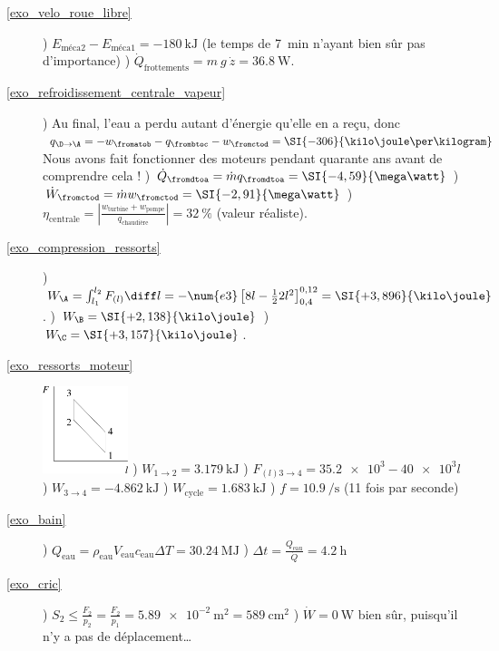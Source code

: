 	\begin{description}
		\item[\ref{exo_velo_roue_libre}] 
					) $E_{\text{méca}2} - E_{\text{méca}1} = \SI{-180}{\kilo\joule}$ (le temps de \SI{7}{\minute} n’ayant bien sûr pas d’importance) 
					) $\dot Q_{\text{frottements}} = m \ g \ \dot z = \SI{36,8}{\watt}$.
		\item[\ref{exo_refroidissement_centrale_vapeur}] 	
					) Au final, l’eau a perdu autant d’énergie qu’elle en a reçu, donc $q_{\D \to \A} = - w_\fromatob - q_\frombtoc - w_\fromctod = \SI{-306}{\kilo\joule\per\kilogram} $ Nous avons fait fonctionner des moteurs pendant quarante ans avant de comprendre cela !
					) $\dot Q_\fromdtoa = \dot m q_\fromdtoa = \SI{-4,59}{\mega\watt}$
					) $\dot W_\fromctod = \dot m w_\fromctod = \SI{-2,91}{\mega\watt}$
					) $\eta_{\text{centrale}} = \left|\frac{w_{\text{turbine}} + w_{\text{pompe}}}{q_{\text{chaudière}}}\right| = \SI{32}{\percent}$ (valeur réaliste).
		\item [\ref{exo_compression_ressorts}]
					) $W_\A = \int_{l_1}^{l_2} F_{(l)} \diff l = - \num{e3} \left[ 8 l - \frac{1}{2} 2 l^2 \right]_{0,4}^{0,12} = \SI{+3,896}{\kilo\joule}$.
					) $W_\B = \SI{+2,138}{\kilo\joule}$ 
					) $W_\C = \SI{+3,157}{\kilo\joule}$.
		\item [\ref{exo_ressorts_moteur}] \includegraphics[width=2.5cm]{images/fdl_ressorts_moteur.png}
					) $W_{1 \to 2} = \SI{+3,179}{\kilo\joule}$ 
					) $F_{(l) 3 \to 4} = \num{35,2e3} - \num{40e3} l$
					) $W_{3 \to 4} = \SI{-4,862}{\kilo\joule}$
					) $W_{\text{cycle}} = \SI{1,683}{\kilo\joule}$
					) $f = \SI{10,9}{\per\second}$ (11 fois par seconde)
		\item [\ref{exo_bain}] 	) $Q_{\text{eau}} = \rho_{\text{eau}} V_{\text{eau}} c_{\text{eau}} \Delta T = \SI{+30,24}{\mega\joule}$ 
					) $\Delta t = \frac{Q_{\text{eau}}}{\dot Q} = \SI{4,2}{\hour}$
		\item [\ref{exo_cric}] 	) $S_2 \leq \frac{F_2}{p_2} = \frac{F_2}{p_1} = \SI{5,89e-2}{\metre\squared} = \SI{589}{\centi\metre\squared}$
					) $\dot W = \SI{0}{\watt}$ bien sûr, puisqu’il n’y a pas de déplacement\ldots

\end{description}
